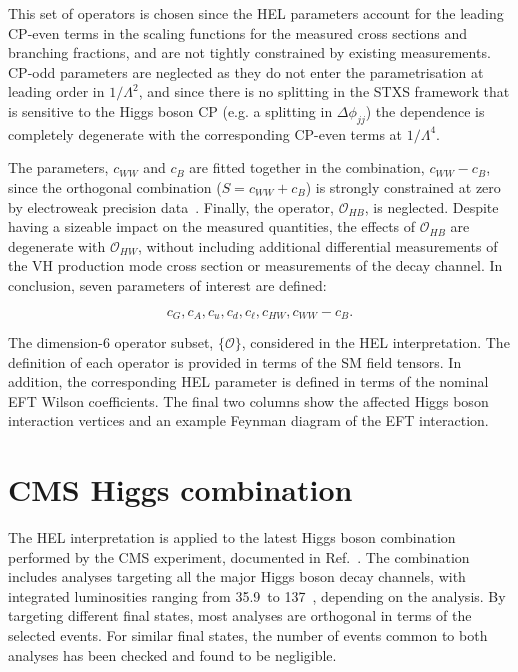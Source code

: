 This set of operators is chosen since the HEL parameters account for the leading CP-even terms in the scaling functions for the measured cross sections and branching fractions, and are not tightly constrained by existing measurements. CP-odd parameters are neglected as they do not enter the parametrisation at leading order in $1/\Lambda^2$, and since there is no splitting in the STXS framework that is sensitive to the Higgs boson CP (e.g. a splitting in $\Delta\phi_{jj}$) the dependence is completely degenerate with the corresponding CP-even terms at $1/\Lambda^4$.

The parameters, $c_{WW}$ and $c_B$ are fitted together in the combination, $c_{WW}-c_B$, since the orthogonal combination ($S=c_{WW}+c_B$) is strongly constrained at zero by electroweak precision data~\cite{Ellis:2014jta}. Finally, the operator, $\mathcal{O}_{HB}$, is neglected. Despite having a sizeable impact on the measured quantities, the effects of $\mathcal{O}_{HB}$ are degenerate with $\mathcal{O}_{HW}$, without including additional differential measurements of the VH production mode cross section or measurements of the \HZg decay channel. In conclusion, seven parameters of interest are defined:

\begin{equation}
    c_G, c_A, c_u, c_d, c_\ell, c_{HW}, c_{WW}-c_B.
\end{equation}

\begin{table}
  \centering
  \scriptsize
  \renewcommand{\arraystretch}{2.5}
  \setlength{\tabcolsep}{3pt}
  \caption[Operator subset in the HEL interpretation]
  {
    The dimension-6 operator subset, $\{\mathcal{O}\}$, considered in the HEL interpretation. The definition of each operator is provided in terms of the SM field tensors. In addition, the corresponding HEL parameter is defined in terms of the nominal EFT Wilson coefficients. The final two columns show the affected Higgs boson interaction vertices and an example Feynman diagram of the EFT interaction. 
  }
  \label{tab:hel_operators}
  
\end{table}

\section{CMS Higgs combination}\label{sec:eft_combination}
The HEL interpretation is applied to the latest Higgs boson combination performed by the CMS experiment, documented in Ref.~\cite{CMS-PAS-HIG-19-005}. The combination includes analyses targeting all the major Higgs boson decay channels, with integrated luminosities ranging from 35.9~\fbinv to 137~\fbinv, depending on the analysis. By targeting different final states, most analyses are orthogonal in terms of the selected events. For similar final states, the number of events common to both analyses has been checked and found to be negligible. 

